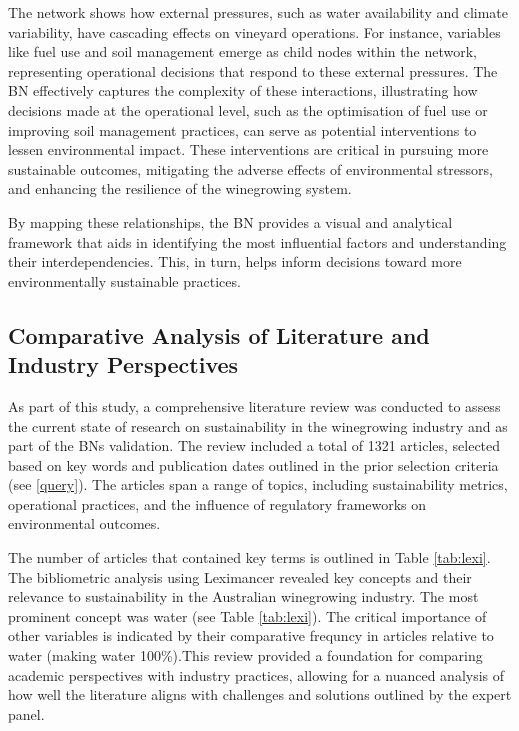 The network shows how external pressures, such as water availability and climate variability, have cascading effects on vineyard operations. For instance, variables like fuel use and soil management emerge as child nodes within the network, representing operational decisions that respond to these external pressures. The BN effectively captures the complexity of these interactions, illustrating how decisions made at the operational level, such as the optimisation of fuel use or improving soil management practices, can serve as potential interventions to lessen environmental impact. These interventions are critical in pursuing more sustainable outcomes, mitigating the adverse effects of environmental stressors, and enhancing the resilience of the winegrowing system.

By mapping these relationships, the BN provides a visual and analytical framework that aids in identifying the most influential factors and understanding their interdependencies. This, in turn, helps inform decisions toward more environmentally sustainable practices.

\subsection{Comparative Analysis of Literature and Industry Perspectives}

As part of this study, a comprehensive literature review was conducted to assess the current state of research on sustainability in the winegrowing industry and as part of the BNs validation. The review included a total of 1321 articles, selected based on key words and publication dates outlined in the prior selection criteria (see \ref{query}). The articles span a range of topics, including sustainability metrics, operational practices, and the influence of regulatory frameworks on environmental outcomes.

The number of articles that contained key terms is outlined in Table \ref{tab:lexi}. The bibliometric analysis using Leximancer revealed key concepts and their relevance to sustainability in the Australian winegrowing industry. The most prominent concept was water (see Table \ref{tab:lexi}). The critical importance of other variables is indicated by their comparative frequncy in articles relative to water (making water 100\%).This review provided a foundation for comparing academic perspectives with industry practices, allowing for a nuanced analysis of how well the literature aligns with challenges and solutions outlined by the expert panel.

